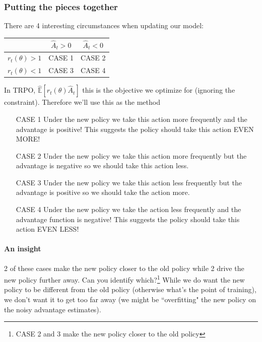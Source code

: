 \documentclass{article}
\begin{document}
\subsubsection{Putting the pieces together}

There are 4 interesting circumstances when updating our model:


\begin{center}
    \begin{tabular}{ c|c|c| } 
    & \(\hat{A}_{t} > 0\)  & \(\hat{A}_{t} < 0\)  \\
    \hline
    \(r_t (\theta) > 1 \) & CASE 1  & CASE 2 \\
    \hline
    \(r_t (\theta) < 1 \) & CASE 3  & CASE 4
\end{tabular}
\end{center}

In TRPO, \(\hat{\mathbb{E}} \left [ r_t(\theta) \hat{A}_t \right]\) this is the objective we optimize for (ignoring the constraint). Therefore we'll use this as the method 

\begin{itemize}
    \item[CASE 1] Under the new policy we take this action more frequently and the advantage is positive! This suggests the policy should take this action EVEN MORE!
    \item[CASE 2] Under the new policy we take this action more frequently but the advantage is negative so we should take this action less.
    \item[CASE 3] Under the new policy we take this action less frequently but the advantage is positive so we should take the action more.
    \item[CASE 4] Under the new policy we take the action less frequently and the advantage function is negative! This suggests the policy should take this action EVEN LESS!
\end{itemize}

\paragraph{An insight} 2 of these cases make the new policy closer to the old policy while 2 drive the new policy further away. Can you identify which?\footnote{CASE 2 and 3 make the new policy closer to the old policy} While we do want the new policy to be different from the old policy (otherwise what's the point of training), we don't want it to get too far away (we might be ``overfitting" the new policy on the noisy advantage estimates).
\end{document}
